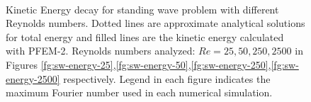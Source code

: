   \begin{figure}[h]
  \centering
     \\
   \caption{Kinetic Energy decay for standing wave problem with different Reynolds numbers. Dotted lines are approximate analytical solutions for total energy and filled lines are the kinetic energy calculated with PFEM-2. Reynolds numbers analyzed: $Re=25,50,250,2500$ in Figures \ref{fg:sw-energy-25},\ref{fg:sw-energy-50},\ref{fg:sw-energy-250},\ref{fg:sw-energy-2500} respectively. Legend in each figure indicates the maximum Fourier number used in each numerical simulation.}
   \label{fg:sw-energy}
\end{figure}
